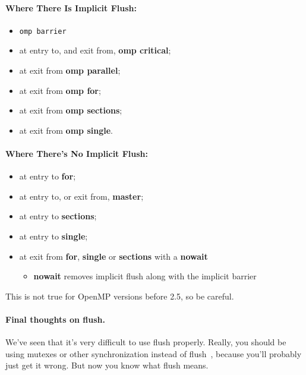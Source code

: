 \documentclass[a4paper]{report}
\begin{document}
\paragraph{Where There Is Implicit Flush:}
  \begin{itemize}[noitemsep]
    \item {\tt omp barrier}
    \item at entry to, and exit from, {\bf omp critical};
    \item at exit from {\bf omp parallel}; 
    \item at exit from {\bf omp for};
    \item at exit from {\bf omp sections};
    \item at exit from {\bf omp single}.
  \end{itemize}

\paragraph{Where There's No Implicit Flush:}
  \begin{itemize}[noitemsep]
    \item at entry to {\bf for};
    \item at entry to, or exit from, {\bf master};
    \item at entry to {\bf sections};
    \item at entry to {\bf single};
    \item at exit from {\bf for}, {\bf single} or {\bf sections} with a {\bf nowait}
      \begin{itemize}
        \item {\bf nowait} removes implicit flush along with the implicit barrier
      \end{itemize}
  \end{itemize}

This is not true for OpenMP versions before 2.5, so be careful.

\paragraph{Final thoughts on flush.} We've seen that it's very difficult to use flush properly. Really, you should be using mutexes or other synchronization instead of flush~\cite{flush}, because you'll probably just get it wrong. But now you know what flush means.
\end{document}
